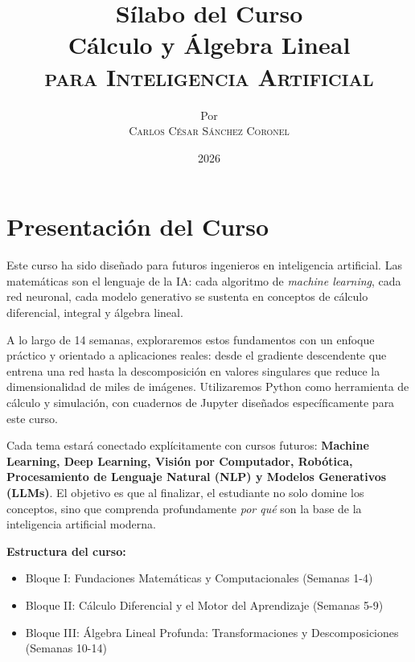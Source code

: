 \documentclass[12pt,a4paper,openany,oneside]{book}
\title{
    \textbf{Sílabo del Curso} \\ 
    \Huge \textbf{Cálculo y Álgebra Lineal} \\
    \Large \textsc{para Inteligencia Artificial} \\[1cm]

}
\author{
    \small Por \\ \vspace{0.2cm}
    \Large \textsc{Carlos César Sánchez Coronel}
}
\date{2026}
\begin{document}
\maketitle
\tableofcontents

\chapter*{Presentación del Curso}

Este curso ha sido diseñado para futuros ingenieros en inteligencia artificial. Las matemáticas son el lenguaje de la IA: cada algoritmo de \textit{machine learning}, cada red neuronal, cada modelo generativo se sustenta en conceptos de cálculo diferencial, integral y álgebra lineal. 

A lo largo de 14 semanas, exploraremos estos fundamentos con un enfoque práctico y orientado a aplicaciones reales: desde el gradiente descendente que entrena una red hasta la descomposición en valores singulares que reduce la dimensionalidad de miles de imágenes. Utilizaremos Python como herramienta de cálculo y simulación, con cuadernos de Jupyter diseñados específicamente para este curso.

Cada tema estará conectado explícitamente con cursos futuros: \textbf{Machine Learning, Deep Learning, Visión por Computador, Robótica, Procesamiento de Lenguaje Natural (NLP) y Modelos Generativos (LLMs)}. El objetivo es que al finalizar, el estudiante no solo domine los conceptos, sino que comprenda profundamente \textit{por qué} son la base de la inteligencia artificial moderna.

\vspace{0.5cm}
\textbf{Estructura del curso:}
\begin{itemize}
    \item[$\square$] Bloque I: Fundaciones Matemáticas y Computacionales (Semanas 1-4)
    \item[$\square$] Bloque II: Cálculo Diferencial y el Motor del Aprendizaje (Semanas 5-9)
    \item[$\square$] Bloque III: Álgebra Lineal Profunda: Transformaciones y Descomposiciones (Semanas 10-14)
\end{itemize}

\end{document}
